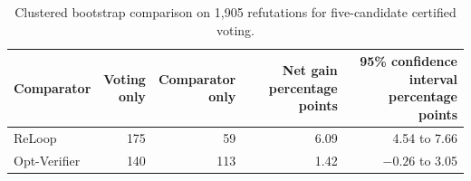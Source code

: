 \begin{table}[htbp]
\caption{Clustered bootstrap comparison on 1,905 refutations for five-candidate certified voting.}
\label{tab:pairednew}
\centering\footnotesize\setlength{\tabcolsep}{3pt}
\begin{tabular*}{\textwidth}{@{\extracolsep{\fill}}lrrrr@{}}
\toprule
Comparator & \shortstack{Voting\\only} & \shortstack{Comparator\\only} & \shortstack{Net gain\\percentage points} & \shortstack{95\% confidence interval\\percentage points} \\
\midrule
ReLoop & 175 & 59 & 6.09 & 4.54 to 7.66 \\
Opt-Verifier & 140 & 113 & 1.42 & $-0.26$ to 3.05 \\
\bottomrule
\end{tabular*}
\end{table}
